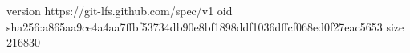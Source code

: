 version https://git-lfs.github.com/spec/v1
oid sha256:a865aa9ce4a4aa7ffbf53734db90e8bf1898ddf1036dffcf068ed0f27eac5653
size 216830
